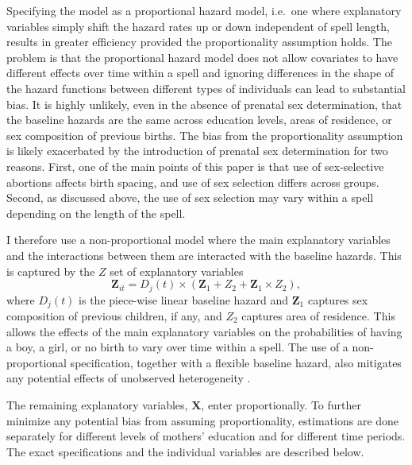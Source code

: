 \documentclass[12pt,letterpaper]{article}
\begin{document}
Specifying the model as a proportional hazard model, i.e.\ one where explanatory variables 
simply shift the hazard rates up or down independent of spell length, results in 
greater efficiency provided the proportionality assumption holds.
The problem is that the proportional hazard model does not allow covariates
to have different effects over time within a spell and ignoring differences in the shape 
of the hazard functions between different types of individuals can lead to substantial bias.
It is highly unlikely, even in the absence of prenatal sex determination, that the 
baseline hazards are the same across education levels, areas of residence, or sex 
composition of previous births.
The bias from the proportionality assumption is likely exacerbated by the 
introduction of prenatal sex determination for two reasons.
First, one of the main points of this paper is that use of sex-selective abortions 
affects birth spacing, and use of sex selection differs across groups.
Second, as discussed above, the use of sex selection may vary within a spell depending
on the length of the spell.

I therefore use a non-proportional model where the main 
explanatory variables and the interactions between them are interacted with the baseline hazards.
This is captured by the $Z$ set of explanatory variables
\begin{equation}
 \mathbf{Z}_{it} = D_j(t) \times (\mathbf{Z}_1 + Z_2 + \mathbf{Z}_1 \times Z_2),
\end{equation}
where $D_j(t)$ is the piece-wise linear baseline hazard and $\mathbf{Z}_1$ captures sex 
composition of previous children, if any, and $Z_2$ captures area of residence.
This allows the effects of the main explanatory variables 
on the probabilities of having a boy, a girl, or no birth to vary over time within a spell.
The use of a non-proportional specification, together with a flexible baseline hazard, 
also mitigates any potential effects of unobserved heterogeneity \citep{Dolton1995}.

The remaining explanatory variables, $\mathbf{X}$, enter proportionally.
To further minimize any potential bias from assuming proportionality, estimations are 
done separately for different levels of mothers' education and for different time periods.
The exact specifications and the individual variables are described below.
\end{document}
